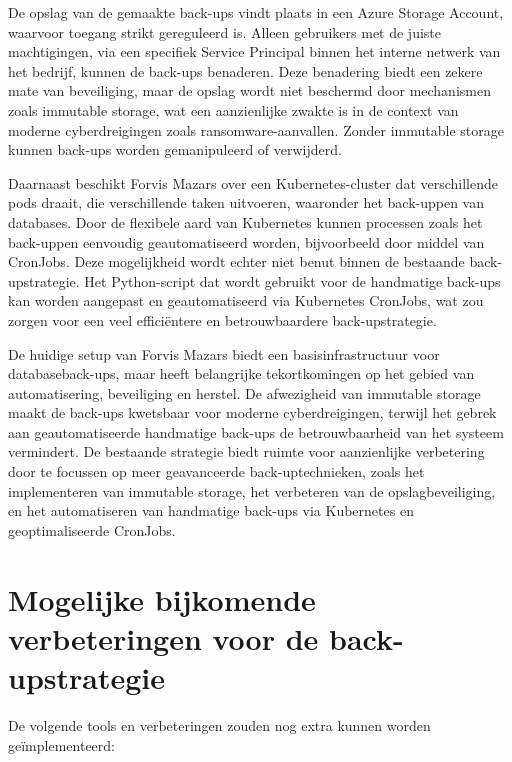 De opslag van de gemaakte back-ups vindt plaats in een Azure Storage Account, waarvoor toegang strikt gereguleerd is. Alleen gebruikers met de juiste machtigingen, via een specifiek Service Principal binnen het interne netwerk van het bedrijf, kunnen de back-ups benaderen. Deze benadering biedt een zekere mate van beveiliging, maar de opslag wordt niet beschermd door mechanismen zoals immutable storage, wat een aanzienlijke zwakte is in de context van moderne cyberdreigingen zoals ransomware-aanvallen. Zonder immutable storage kunnen back-ups worden gemanipuleerd of verwijderd.

Daarnaast beschikt Forvis Mazars over een Kubernetes-cluster dat verschillende pods draait, die verschillende taken uitvoeren, waaronder het back-uppen van databases. Door de flexibele aard van Kubernetes kunnen processen zoals het back-uppen eenvoudig geautomatiseerd worden, bijvoorbeeld door middel van CronJobs. Deze mogelijkheid wordt echter niet benut binnen de bestaande back-upstrategie. Het Python-script dat wordt gebruikt voor de handmatige back-ups kan worden aangepast en geautomatiseerd via Kubernetes CronJobs, wat zou zorgen voor een veel efficiëntere en betrouwbaardere back-upstrategie.

De huidige setup van Forvis Mazars biedt een basisinfrastructuur voor databaseback-ups, maar heeft belangrijke tekortkomingen op het gebied van automatisering, beveiliging en herstel. De afwezigheid van immutable storage maakt de back-ups kwetsbaar voor moderne cyberdreigingen, terwijl het gebrek aan geautomatiseerde handmatige back-ups de betrouwbaarheid van het systeem vermindert. De bestaande strategie biedt ruimte voor aanzienlijke verbetering door te focussen op meer geavanceerde back-uptechnieken, zoals het implementeren van immutable storage, het verbeteren van de opslagbeveiliging, en het automatiseren van handmatige back-ups via Kubernetes en geoptimaliseerde CronJobs.
\section{Mogelijke bijkomende verbeteringen voor de back-upstrategie}
De volgende tools en verbeteringen zouden nog extra kunnen worden geïmplementeerd:

